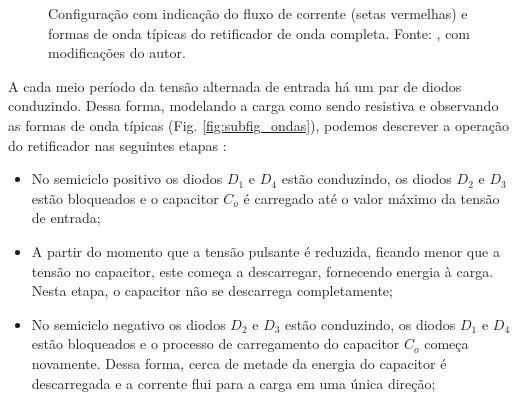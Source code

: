 \begin{figure}[H]
\centering
{}
\qquad
{}
\caption{Configuração com indicação do fluxo de corrente (setas vermelhas) e formas de onda típicas do retificador de onda completa. Fonte: , com modificações do autor.}
\label{fig:globfig}
\end{figure}

A cada meio período da tensão alternada de entrada há um par de diodos conduzindo. Dessa forma, modelando a carga como sendo resistiva e observando as formas de onda típicas (Fig. \ref{fig:subfig_ondas}), podemos descrever a operação do retificador nas seguintes etapas \cite{retificador}:

\begin{itemize}
    \item  No semiciclo positivo os diodos $D_{1}$ e $D_{4}$ estão conduzindo, os diodos $D_{2}$ e $D_{3}$ estão bloqueados e o capacitor $C_{o}$ é carregado até o valor máximo da tensão de entrada;
    
    \item A partir do momento que a tensão pulsante é reduzida, ficando menor que a tensão no capacitor, este começa a descarregar, fornecendo energia à carga. Nesta etapa, o capacitor não se descarrega completamente;
    
    \item No semiciclo negativo os diodos $D_{2}$ e $D_{3}$ estão conduzindo, os diodos $D_{1}$ e $D_{4}$ estão bloqueados e o processo de carregamento do capacitor $C_{o}$ começa novamente. Dessa forma, cerca de metade da energia do capacitor é descarregada e a corrente flui para a carga em uma única direção;
    
\end{itemize}

